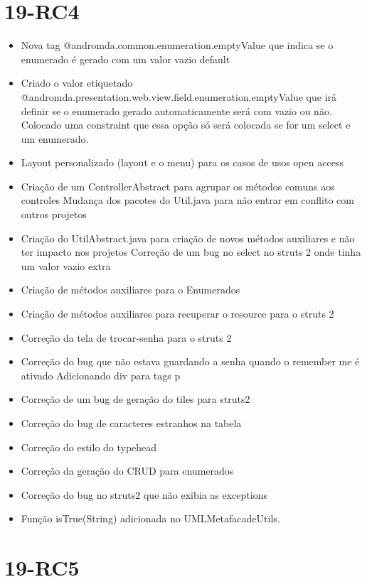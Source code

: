 \section{19-RC4}

\begin{itemize}
  \item Nova tag @andromda.common.enumeration.emptyValue que indica se o
  enumerado é gerado com um valor vazio default
  \item Criado o valor etiquetado
@andromda.presentation.web.view.field.enumeration.emptyValue que irá definir se
o enumerado gerado automaticamente será com vazio ou não. Colocado uma
constraint que essa opção só será colocada se for um select e um enumerado.
  \item Layout personalizado (layout e o menu) para os casos de usos open access
  \item Criação de um ControllerAbstract para agrupar os métodos comuns aos
controles Mudança dos pacotes do Util.java para não entrar em conflito com outros projetos
  \item Criação do UtilAbstract.java para criação de novos métodos auxiliares e
não ter impacto nos projetos Correção de um bug no select no struts 2 onde tinha um valor vazio extra 
  \item Criação de métodos auxiliares para o Enumerados
  \item Criação de métodos auxiliares para recuperar o resource para o struts 2
  \item Correção da tela de trocar-senha para o struts 2
  \item Correção do bug que não estava guardando a senha quando o remember me é
ativado Adicionando div para tags p
  \item Correção de um bug de geração do tiles para struts2
  \item Correção do bug de caracteres estranhos na tabela
  \item Correção do estilo do typehead
  \item Correção da geração do CRUD para enumerados 
  \item Correção do bug no struts2 que não exibia as exceptions
  \item Função isTrue(String) adicionada no UMLMetafacadeUtils.
\end{itemize}

\section{19-RC5}

